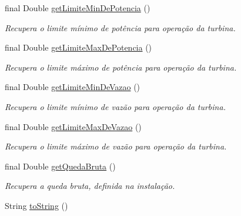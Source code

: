 \begin{DoxyCompactItemize}
final Double \hyperlink{classusina_1_1_turbina_aee3faa93f4d92db651edbea96d1df938}{get\-Limite\-Min\-De\-Potencia} ()
\begin{DoxyCompactList}\small\item\em Recupera o limite mínimo de potência para operação da turbina. \end{DoxyCompactList}\item 
final Double \hyperlink{classusina_1_1_turbina_ae08079645408277e5f4b34869c8fbdbc}{get\-Limite\-Max\-De\-Potencia} ()
\begin{DoxyCompactList}\small\item\em Recupera o limite máximo de potência para operação da turbina. \end{DoxyCompactList}\item 
final Double \hyperlink{classusina_1_1_turbina_a62be0e3ac4c6461fc2202b6b97cbf8ec}{get\-Limite\-Min\-De\-Vazao} ()
\begin{DoxyCompactList}\small\item\em Recupera o limite mínimo de vazão para operação da turbina. \end{DoxyCompactList}\item 
final Double \hyperlink{classusina_1_1_turbina_aa13d59b00e57632fcfc9db6f651d4a9d}{get\-Limite\-Max\-De\-Vazao} ()
\begin{DoxyCompactList}\small\item\em Recupera o limite máximo de vazão para operação da turbina. \end{DoxyCompactList}\item 
final Double \hyperlink{classusina_1_1_turbina_aa31333043136ac0d431d3347099e268e}{get\-Queda\-Bruta} ()
\begin{DoxyCompactList}\small\item\em Recupera a queda bruta, definida na instalação. \end{DoxyCompactList}\item 
String \hyperlink{classusina_1_1_turbina_af0070ee6333afe97856a58e309e72064}{to\-String} ()
\end{DoxyCompactItemize}
